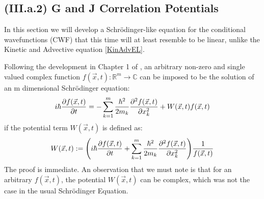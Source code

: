 \documentclass[11pt, a4paper]{article} %
\newcommand{\R}{\mathbb{R}} %
\newcommand{\C}{\mathbb{C}}
\begin{document}


\subsection*{(III.a.2) G and J Correlation Potentials}
In this section we will develop a Schrödinger-like equation for the conditional wavefunctions (CWF) that this time will at least resemble to be linear, unlike the Kinetic and Advective equation \eqref{KinAdvEL}.

Following the development in Chapter 1 of \cite{JordiXO}, an arbitrary non-zero and single valued complex function $f(\vec{x}, t):\R^m \rightarrow \C$ can be imposed to be the solution of an m dimensional Schrödinger equation:
\begin{equation}
i \hbar \pdv{f(\vec{x},t)}{t} = -\sum_{k=1}^m\frac{\hbar^2}{2 m_k}\pdv[2]{f(\vec{x},t)}{x_k} + W(\vec{x},t) f(\vec{x},t)
\end{equation}
if the potential term $W(\vec{x}, t)$ is defined as:
\begin{equation}
W(\vec{x}, t) := \qty(i \hbar \pdv{f(\vec{x},t)}{t} +\sum_{k=1}^m\frac{\hbar^2}{2 m_k}\pdv[2]{f(\vec{x},t)}{x_k} ) \frac{1}{f(\vec{x},t)}
\end{equation}
The proof is immediate. An observation that we must note is that for an arbitrary $f(\vec{x},t)$, the potential $W(\vec{x},t)$ can be complex, which was not the case in the usual Schrödinger Equation.
\end{document}
